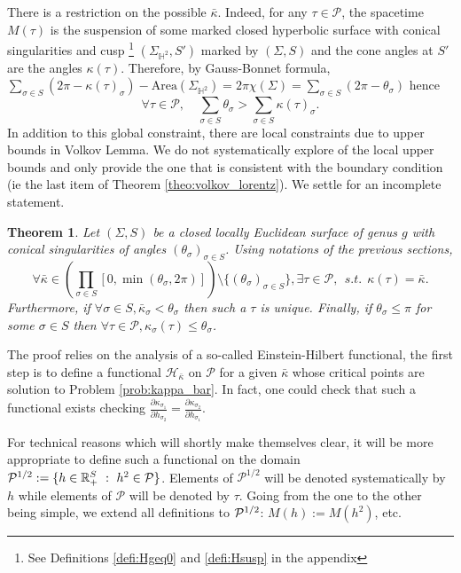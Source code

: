 \documentclass[a4paper,12pt]{article}
\def\H{\mathbb{H}}
\def\adm{\P}
\def\RR{\mathbb{R}}
\def\adm{\mathcal{P}}
\def\P{\mathcal{P}}
\newtheorem{theo}{Theorem}	%
\theoremstyle{definition}
\begin{document}
				
				There is a restriction on the possible $\bar\kappa$. Indeed, for any $\tau\in \adm$, the spacetime $M(\tau)$ is the suspension of some marked closed 
				hyperbolic surface with conical singularities and cusp 
				\footnote{See Definitions \ref{defi:Hgeq0} and \ref{defi:Hsusp} in the appendix} $(\Sigma_{\H^2}, S')$  marked by $(\Sigma,S)$ and the cone angles at $S'$ are the angles $\kappa(\tau)$. Therefore, by Gauss-Bonnet formula, 
				$\sum_{\sigma\in S} (2\pi-\kappa(\tau)_\sigma)- \mathrm{Area}(\Sigma_{\H^2}) = 2\pi\chi(\Sigma) = \sum_{\sigma\in S}(2\pi-\theta_\sigma)$
				hence 
				$$\forall \tau\in \adm,\quad \sum_{\sigma \in S} \theta_\sigma> \sum_{\sigma\in S}\kappa(\tau)_\sigma.$$
				In addition to this global constraint, there are local constraints due to upper bounds in Volkov Lemma. We do not systematically explore of the local upper bounds and only provide the one that is consistent with the boundary condition (ie the last item of Theorem \ref{theo:volkov_lorentz}).
				We settle for an incomplete statement.
				\begin{theo} 
				Let $(\Sigma,S)$ be a closed locally Euclidean surface of genus $g$ with conical singularities of angles $(\theta_\sigma)_{\sigma\in S}$.
				Using notations of the previous sections,
				$$\forall \bar\kappa\in \left(\prod_{\sigma\in S}[0,\min(\theta_\sigma,2\pi)]\right)\setminus \{(\theta_\sigma)_{\sigma\in S}\},\exists\tau\in \adm,~~s.t.~~ \kappa(\tau)=\bar\kappa.$$
				Furthermore, if $\forall \sigma\in S,\bar\kappa_\sigma<\theta_\sigma$ then such a $\tau$ is unique.
				Finally, if $\theta_\sigma\leq\pi$ for some $\sigma\in S$ then $\forall \tau\in \adm,\kappa_\sigma(\tau)\leq \theta_\sigma$.
			\end{theo}
				
				The proof relies on the analysis of a so-called Einstein-Hilbert functional, the first step is to define 
				a functional $\mathcal{H}_{\bar\kappa}$ on $\adm$ for a given $\bar\kappa$ whose critical points are solution to Problem \ref{prob:kappa_bar}. In fact, one could check that such a functional exists checking $\frac{\partial\kappa_{\sigma_1}}{\partial h_{\sigma_2}} = \frac{\partial\kappa_{\sigma_2}}{\partial h_{\sigma_1}} $.
				
				For technical reasons which will shortly make themselves clear, it will be more appropriate to define such a functional on the domain $\Psq:= \{h\in \RR_+^S~:~ h^2\in \adm\}$.
				Elements of $\adm^{1/2}$ will be denoted systematically by $h$ while elements of $\adm$ will be denoted by $\tau$. Going from the one to the other being simple, we extend all definitions to $\Psq$:
				$M(h):= M(h^2)$, etc.
				
\end{document}
